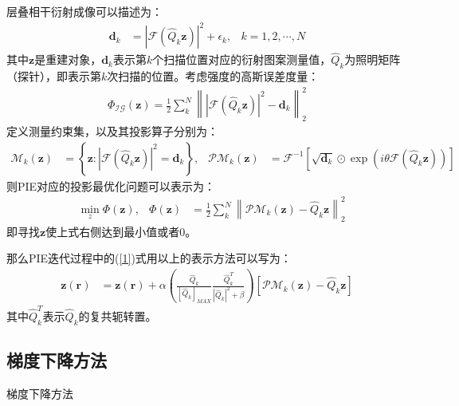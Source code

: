 \documentclass[10pt,aspectratio=169]{beamer} %
\renewcommand{\vec}[1]{\boldsymbol{#1}} %
\begin{document}
\begin{frame}[allowframebreaks]
    层叠相干衍射成像可以描述为：
    \begin{align*}
        \vec{d}_k & =|\mathcal{F} (\hat{Q}_k \vec{z})|^2+\epsilon_k, & k=1,2,\cdots ,N
    \end{align*}
    其中$\vec{z}$是重建对象，$\vec{d}_k$表示第$k$个扫描位置对应的衍射图案测量值，$\hat{Q}_k$为照明矩阵（探针），即表示第$k$次扫描的位置。考虑强度的高斯误差度量：
    \begin{align*}
        \Phi _{\mathcal{IG}}(\vec{z})=\frac{1}{2}\sum_k^N \left\lVert |\mathcal{F}(\hat{Q}_k \vec{z})|^2 -\vec{d}_k \right\rVert _2^2
    \end{align*}
    定义测量约束集，以及其投影算子分别为：
    \begin{align*}
        \mathcal{M}_k (\vec{z}) & =\left\{\vec{z} : |\mathcal{F}(\hat{Q}_k \vec{z})|^2=\vec{d}_k\right\}, & \mathcal{PM}_k (\vec{z}) & =\mathcal{F}^{-1} \left[\sqrt{\vec{d}_k}\odot \exp{(i \theta \mathcal{F}(\hat{Q}_k \vec{z}))}\right]
    \end{align*}
    则PIE对应的投影最优化问题可以表示为：
    \begin{align}
         & \min \limits_z \Phi (\vec{z}), & \Phi (\vec{z}) & =\frac{1}{2}\sum_k^N \left\lVert \mathcal{PM}_k(\vec{z})-\hat{Q}_k \vec{z} \right\rVert _2^2 \label{2}
    \end{align}
    即寻找$\vec{z}$使上式右侧达到最小值或者0。
    
    那么PIE迭代过程中的(\ref{1})式用以上的表示方法可以写为：
    \begin{align}
        \vec{z}(\vec{r}) & =\vec{z}(\vec{r})+\alpha \left(\frac{\hat{Q}_k}{[\hat{Q}_k]_{MAX}} \frac{\hat{Q}_k^T}{|\hat{Q}_k|^2+\beta}\right)[\mathcal{PM}_k(\vec{z})-\hat{Q}_k \vec{z}] \label{3}
    \end{align}
    其中$\hat{Q}_k^T$表示$\hat{Q}_k$的复共轭转置。
\end{frame}

\subsection{梯度下降方法}

\begin{frame}
    \begin{algorithm}[H]
        \LinesNumbered
        \caption{\small 梯度下降方法}
        \label{A1}
    \end{algorithm}
\end{frame}
\end{document}

